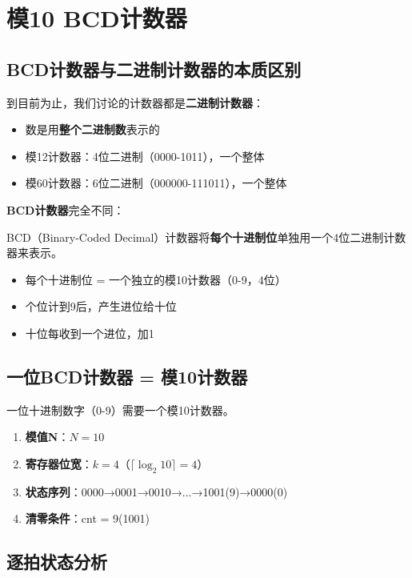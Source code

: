 \chapter{模10 BCD计数器}

\section{BCD计数器与二进制计数器的本质区别}

到目前为止，我们讨论的计数器都是\textbf{二进制计数器}：

\begin{itemize}
  \item 数是用\textbf{整个二进制数}表示的
  \item 模12计数器：4位二进制（0000-1011），一个整体
  \item 模60计数器：6位二进制（000000-111011），一个整体
\end{itemize}

\textbf{BCD计数器}完全不同：

\begin{keypoint}[BCD计数器的本质]
BCD（Binary-Coded Decimal）计数器将\textbf{每个十进制位}单独用一个4位二进制计数器来表示。

\begin{itemize}
  \item 每个十进制位 = 一个独立的模10计数器（0-9，4位）
  \item 个位计到9后，产生进位给十位
  \item 十位每收到一个进位，加1
\end{itemize}
\end{keypoint}

\section{一位BCD计数器 = 模10计数器}

一位十进制数字（0-9）需要一个模10计数器。

\begin{enumerate}
  \item \textbf{模值N}：$N = 10$
  \item \textbf{寄存器位宽}：$k = 4$（$\lceil \log_2 10 \rceil = 4$）
  \item \textbf{状态序列}：0000→0001→0010→...→1001(9)→0000(0)
  \item \textbf{清零条件}：cnt = 9(1001)
\end{enumerate}

\section{逐拍状态分析}

